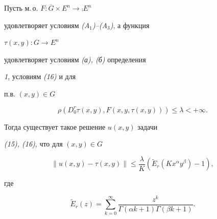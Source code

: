  


\begin{thm} Пусть м.\,о. $F:\overline G\times E^n\to\comp E^n$ 


удовлетворяет условиям {\em (A${}_1$)--(A${}_3$)}, а функция 


$\tau(x,y):G\to E^n$ 


удовлетворяет условиям {\em (а), (б)} определения 


{\em 1}, условиям {\em (16)} и для 


п.в. $(x,y)\in G$ 


\begin{equation} 


\rho(D_0^r\tau(x,y),F(x,y,\tau(x,y)))\le\lambda<+\infty.\tag{20} 


\end{equation} 


 


Тогда существует такое решение $u(x,y)$ задачи 


{\em (15), (16)}, что для $(x,y)\in G$ 


\begin{equation} 


\|u(x,y)-\tau(x,y)\|\le\frac{\lambda}{K}(\widetilde E_r 


(Kx^\alpha y^\beta)-1),\tag{21} 


\end{equation} 


где 


$$ 


\widetilde E_r(z)=\sum_{k=0}^\infty 


\frac{z^k}{\Gamma(\alpha k+1)\Gamma(\beta k+1)}. 


$$ 


\end{thm} 


 


